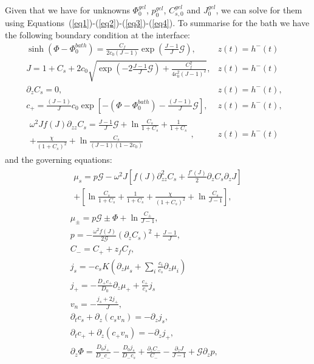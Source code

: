 \documentclass[12pt]{extarticle}
\begin{document}
Given that we have for unknowns $\Phi^{gel}_0$, $p^{gel}_0$, $C^{gel}_{s,0}$ and $J^{gel}_0$, we can solve for them using Equations~(\ref{eq1})-(\ref{eq2})-(\ref{eq3})-(\ref{eq4}). 
To summarise for the bath we have the following boundary condition at the interface:
\begin{eqnarray}
\sinh(\Phi-\Phi_0^{bath})= \frac{C_f}{2c_0 (J-1)}\exp\left(\frac{J-1}{J}\mathcal{G}\right), & z(t)=h^-(t)&\\
J=1+C_{s}+ 2c_0\sqrt{\exp\left(-2\frac{J-1}{J}\mathcal{G}\right)+\frac{C^2_f}{4c^2_0 (J-1)^2}}, & z(t)=h^-(t)&\\[4mm]
\partial_z C_{s}=0,&  z(t)=h^-(t),&\\[5mm]
c_{+} = \frac{(J-1)}{J}c_0\exp\left[-(\Phi-\Phi_0^{bath})-\frac{(J-1)}{J}\mathcal{G}\right], &z(t)=h^-(t),&\\
\begin{aligned}
\omega^2 J f(J)\partial_{zz} C_s= \frac{J-1}{J} \mathcal{G}  + \ln \frac{C_s}{1+C_{s}} + \frac{1}{1+C_s}\\+\frac{\chi}{(1+C_{s})^2} + \ln \frac{C_s}{(J-1)(1-2c_0)}
\end{aligned}, & z(t)=h^-(t)&
\end{eqnarray}
and the governing equations:
\begin{gather}
\begin{aligned}
\mu_s = p \mathcal{G}  - \omega^2 J \left[f(J)\partial_{zz}^2 C_s+\frac{f'(J)}{2}\partial_z C_s\partial_z J\right]\\
+ \left[\ln \frac{C_s}{1+C_s} + \frac{1}{1+C_s}+\frac{\chi}{(1+C_s)^2} + \ln \frac{C_s}{J-1} \right], 
\end{aligned}\\[2.5mm]
\mu_\pm = p \mathcal{G} \pm \Phi + \ln \frac{C_\pm}{J-1} ,\\
p=-\frac{\omega^2 f(J)}{2\mathcal{G}} (\partial_z C_s)^2+ \frac{J-1}{J},\\
C_- = C_+ + z_f C_f,\\
j_s =-c_sK  \left(\partial_z\mu_s +\sum_i \frac{c_i}{c_s} \partial_z \mu_i\right)\\
j_+= - \frac{D_+ c_+}{D_0}\partial_z \mu_+ + \frac{c_+}{c_s}j_s\\
v_n = - \frac{j_s+2j_+}{J},\\
\partial_t c_s + \partial_z (c_s v_n)=- \partial_z j_s,\\
\partial_t c_+ +\partial_z (c_+ v_n)= -\partial_zj_+,\\
\partial_z \Phi = \frac{D_0 j_+}{D_-c_-}- \frac{D_0 j_s}{D_-c_s} + \frac{\partial_z C_-}{C_-}-\frac{\partial_z J}{J-1}+\mathcal{G}\partial_z p,
\end{gather}
\end{document}
